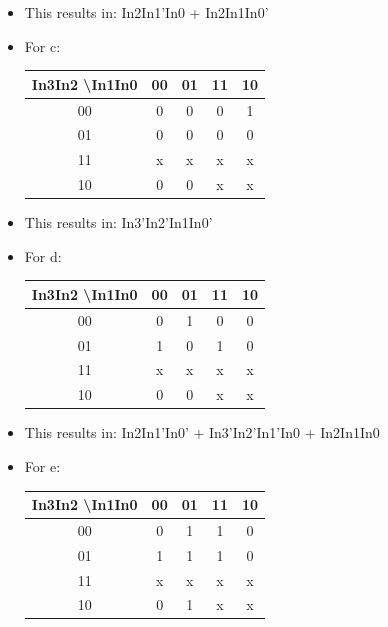 \begin{itemize}
  \item This results in: In2In1'In0 + In2In1In0'

  \item For c:

    \begin{center}
      \begin{tabular}[h!]{|c | c | c | c | c |}
        \hline
        In3In2 \textbackslash  In1In0 & 00 & 01 & 11 & 10\\
        \hline
        00 & 0 & 0 & 0 & 1\\
        \hline
        01 & 0 & 0 & 0 & 0\\
        \hline
        11 & x & x & x & x\\
        \hline
        10 & 0 & 0 & x & x\\
        \hline
      \end{tabular}
    \end{center}

  \item This results in: In3'In2'In1In0'

  \item For d:

    \begin{center}
      \begin{tabular}[h!]{|c | c | c | c | c |}
        \hline
        In3In2 \textbackslash  In1In0 & 00 & 01 & 11 & 10\\
        \hline
        00 & 0 & 1 & 0 & 0\\
        \hline
        01 & 1 & 0 & 1 & 0\\
        \hline
        11 & x & x & x & x\\
        \hline
        10 & 0 & 0 & x & x\\
        \hline
      \end{tabular}
    \end{center}

  \item This results in: In2In1'In0' + In3'In2'In1'In0 + In2In1In0

  \item For e:

    \begin{center}
      \begin{tabular}[h!]{|c | c | c | c | c |}
        \hline
        In3In2 \textbackslash  In1In0 & 00 & 01 & 11 & 10\\
        \hline
        00 & 0 & 1 & 1 & 0\\
        \hline
        01 & 1 & 1 & 1 & 0\\
        \hline
        11 & x & x & x & x\\
        \hline
        10 & 0 & 1 & x & x\\
        \hline
      \end{tabular}
    \end{center}


\end{itemize}
